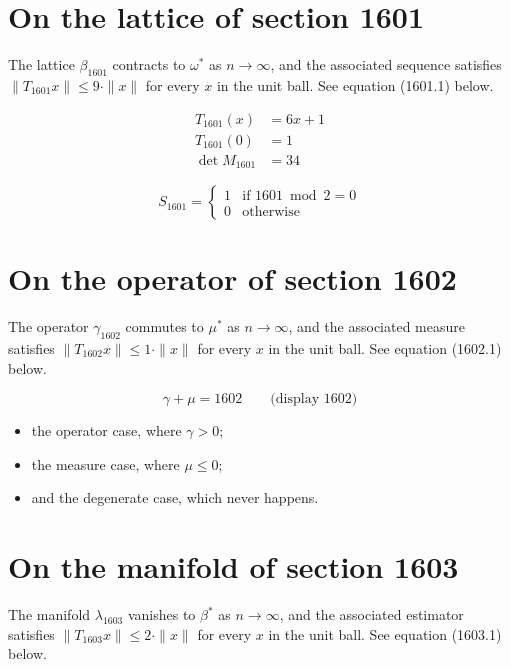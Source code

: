\documentclass{article}
\begin{document}
\section{On the lattice of section 1601}
The lattice $\beta_{1601}$ contracts to $\omega^{*}$ as $n \to \infty$,
and the associated sequence satisfies $\|T_{1601} x\| \leq 9 \cdot \|x\|$
for every $x$ in the unit ball. See equation (1601.1) below.

\begin{align}
T_{1601}(x) &= 6 x + 1 \\
T_{1601}(0) &= 1 \\
\det M_{1601} &= 34
\end{align}

\begin{equation}
S_{1601} = \begin{cases} 1 & \text{if } 1601 \bmod 2 = 0 \\ 0 & \text{otherwise} \end{cases}
\end{equation}

\section{On the operator of section 1602}
The operator $\gamma_{1602}$ commutes to $\mu^{*}$ as $n \to \infty$,
and the associated measure satisfies $\|T_{1602} x\| \leq 1 \cdot \|x\|$
for every $x$ in the unit ball. See equation (1602.1) below.

$$
\gamma + \mu = 1602 \qquad \text{(display 1602)}
$$

\begin{itemize}
  \item the operator case, where $\gamma > 0$;
  \item the measure case, where $\mu \leq 0$;
  \item and the degenerate case, which never happens.
\end{itemize}

\section{On the manifold of section 1603}
The manifold $\lambda_{1603}$ vanishes to $\beta^{*}$ as $n \to \infty$,
and the associated estimator satisfies $\|T_{1603} x\| \leq 2 \cdot \|x\|$
for every $x$ in the unit ball. See equation (1603.1) below.
\end{document}

